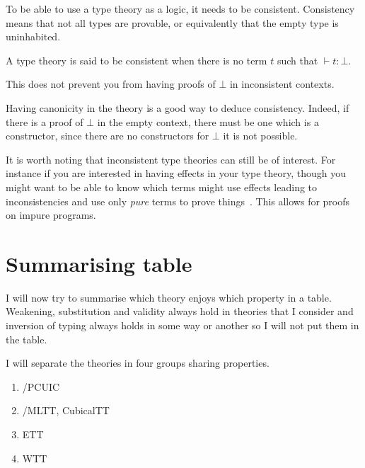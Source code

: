 To be able to use a type theory as a logic, it needs to be consistent.
Consistency means that not all types are provable, or equivalently that
the empty type is uninhabited.

\begin{definition}[Consistency]
  A type theory is said to be consistent when there is no term \(t\) such that
  \(\vdash t : \bot\).
\end{definition}

This does not prevent you from having proofs of \(\bot\) in inconsistent
contexts.

Having canonicity in the theory is a good way to deduce consistency.
Indeed, if there is a proof of \(\bot\) in the empty context, there must be
one which is a constructor, since there are no constructors for \(\bot\)
it is not possible.

It is worth noting that inconsistent type theories can still be of interest.
For instance if you are interested in having effects in your type theory,
though you might want to be able to know which terms might use effects leading
to inconsistencies and use only \emph{pure} terms to prove
things~.
This allows for proofs on impure programs.

\section{Summarising table}

I will now try to summarise which theory enjoys which property in a table.
Weakening, substitution and validity always hold in theories that I consider and
inversion of typing always holds in some way or another so I will not put them
in the table.

I will separate the theories in four groups sharing properties.
\begin{enumerate}[label=(\Alph*)]
  \item \label{item:coq} \Coq/\acrlong{PCUIC}
  \item \label{item:agda} \Agda/\acrlong{MLTT}, \acrlong{CubicalTT}
  \item \label{item:ett} \acrlong{ETT}
  \item \label{item:wtt} \acrlong{WTT}
\end{enumerate}

